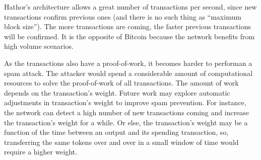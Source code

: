 Hathor's architecture allows a great number of transactions per second, since new transactions confirm previous ones (and there is no such thing as ``maximum block size''). The more transactions are coming, the faster previous transactions will be confirmed. It is the opposite of Bitcoin because the network benefits from high volume scenarios.

As the transactions also have a proof-of-work, it becomes harder to performan a spam attack. The attacker would spend a considerable amount of computational resources to solve the proof-of-work of all transactions. The amount of work depends on the transaction's weight. Future work may explore automatic adjustments in transaction's weight to improve spam prevention. For instance, the network can detect a high number of new transactions coming and increase the transaction's weight for a while. Or else, the transaction's weight may be a function of the time between an output and its spending transaction, so, transferring the same tokens over and over in a small window of time would require a higher weight.










